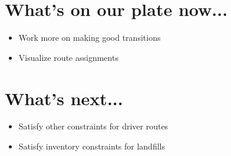 \documentclass{article}
\begin{document}
\section{What's on our plate now...}
\begin{itemize}
  \item Work more on making good transitions
  \item Visualize route assignments
\end{itemize}
\section{What's next...}
\begin{itemize}
  \item Satisfy other constraints for driver routes
  \item Satisfy inventory constraints for landfills
\end{itemize}
\end{document}
